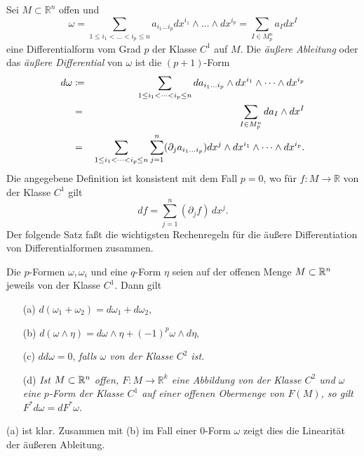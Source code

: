 \documentclass[a4paper,twoside,DIV15,BCOR12mm]{scrbook}
\begin{document}
 Sei $M \subset {\mathbb R}^{n}$ offen und
\[ \omega = \sum_{1 \le i_{1} < \dots < i_{p} \le n} a_{i_{1} \dots 
i_{p}} dx^{i_1} \wedge \dots \wedge dx^{i_p} = \sum_{I \in M_{p}^{n}} 
a_{I} dx^{I}  \]
eine Differentialform vom Grad $p$ der Klasse $C^{1}$ auf $M$. Die 
{\em äußere Ableitung} oder das {\em äußere Differential}  
  von $\omega$ ist 
die $(p+1)$-Form
\begin{eqnarray*}
d\omega & \da  & \sum_{1 \le i_{1} < \dots < i_{p} \le n} da_{i_{1} 
\dots i_{p}} \wedge dx^{i_1} \wedge \dots \wedge dx^{i_p} \\
& = & \sum_{I \in M_{p}^{n}} da_{I} \wedge dx^{I} \\
& = & \sum_{1 \le i_{1} < \dots < i_{p} \le n} \sum_{j=1}^{n} 
(\partial_{j} a_{i_{1} \dots i_{p}}) dx^{j} \wedge dx^{i_1} \wedge 
\dots \wedge dx^{i_p}.
\end{eqnarray*}
Die angegebene Definition ist konsistent mit dem Fall $p = 0$, wo 
für $f: M \to {\mathbb R}$ von der Klasse $C^{1}$ gilt
\[ df = \sum_{j=1}^{n}(\partial_{j}f) \, dx^{j}. \]
Der folgende Satz faßt die wichtigsten Rechenregeln für die äußere 
Differentiation von Differentialformen zusammen. 

\bigskip

\begin{satz}\label{Satz3.4.3} {Die $p$-Formen $\omega,\omega_{i}$  
und eine $q$-Form $\eta$ seien auf der offenen Menge $M\subset\mathbb{R}^n$ jeweils 
von der Klasse $C^{1}$. Dann gilt}
\begin{enumerate}
\item[{\rm (a)}] $d(\omega_{1} + \omega_{2}) = d\omega_{1} + d\omega_{2}$,
\item[{\rm (b)}] $d(\omega \wedge \eta) = d\omega \wedge \eta + (-1)^{p} \omega 
\wedge d\eta$,
\item[{\rm (c)}] $dd\omega = 0$, {\em falls $\omega$ von der Klasse $C^{2}$ ist.}
\item[{\rm (d)}] {\em Ist $M\subset\mathbb{R}^n$ offen, $F: M \to {\mathbb R}^{k}$ eine Abbildung von der Klasse 
$C^{2}$ und $\omega$ eine $p$-Form der Klasse $C^{1}$ auf einer offenen 
Obermenge von $F(M)$, so gilt $F^{*}d\omega = dF^{*}\omega$.}
\end{enumerate}
\end{satz}

\bigskip

 (a) ist klar. Zusammen mit (b) im Fall einer 
0-Form $\omega$ zeigt dies die Linearität der äußeren Ableitung.\\
\end{document}
